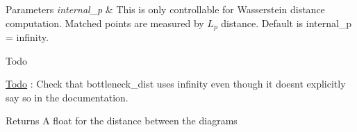 \begin{DoxyParams}{Parameters}
{\em internal\+\_\+p} & This is only controllable for Wasserstein distance computation. Matched points are measured by $L_p$ distance. Default is internal\+\_\+p = infinity. \\
\hline
\end{DoxyParams}
\begin{DoxyRefDesc}{Todo}
\item[\hyperlink{todo__todo000003}{Todo}]\+: Check that bottleneck\+\_\+dist uses infinity even though it doesn\textquotesingle{}t explicitly say so in the documentation.\end{DoxyRefDesc}


\begin{DoxyReturn}{Returns}
A float for the distance between the diagrams 
\end{DoxyReturn}
